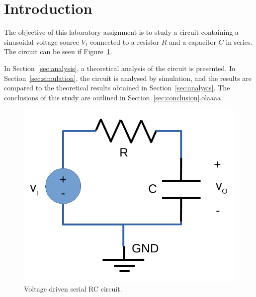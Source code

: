 \section{Introduction}
\label{sec:introduction}

The objective of this laboratory assignment is to study a circuit containing a sinusoidal voltage source $V_I$ connected to a resistor $R$ and a capacitor $C$ in series. The circuit can be seen if Figure~\ref{fig:rc}.

In Section~\ref{sec:analysis}, a theoretical analysis of the circuit is presented. In Section~\ref{sec:simulation}, the circuit is analysed by simulation, and the results are compared to the theoretical results obtained in Section~\ref{sec:analysis}. The conclusions of this study are outlined in Section~\ref{sec:conclusion}.olaaaa

\begin{figure}[H] \centering
\includegraphics[width=0.8\linewidth]{rc.pdf}
\caption{Voltage driven serial RC circuit.}
\label{fig:rc}
\end{figure}

